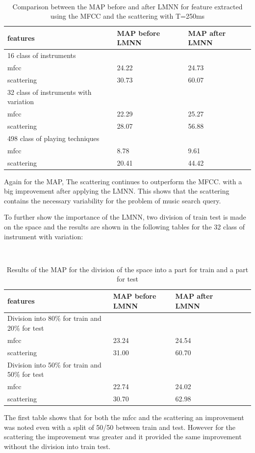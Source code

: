\documentclass[hidelinks,12pt]{report}
\begin{document}
  \begin{table} [H]
\begin{center} 
\ 
 \setlength{\tabcolsep}{.16667em} 
\begin{tabular}{|l|l|l|} 
\hline
features & MAP before LMNN & MAP after LMNN  \\ 
\hline 
16 class of instruments \\ 
\hline
mfcc         &     24.22& 24.73   \\ 
scattering   &30.73  & 60.07 \\ 

\hline 
32 class of instruments with variation \\ 
\hline
mfcc &22.29 & 25.27  \\ 
scattering &28.07& 56.88  \\ 
\hline 
498 class of playing techniques \\ 
\hline
mfcc &  8.78 & 9.61  \\ 
scattering &20.41& 44.42  \\ 
\hline
\end{tabular} 
\end{center} 
\caption{Comparison between the MAP before and after LMNN for feature extracted using the MFCC and the scattering with T=250ms} 
\label{you} 
\end{table}
Again for the MAP, The scattering continues to outperform the MFCC. with a big improvement after applying the LMNN. This shows that the scattering contains the necessary variability for the problem of music search query.\par
To further show the importance of the LMNN, two division of train test is made on the space and the results are shown in the following tables for the 32 class of instrument with variation:
\begin{table} [H]
\begin{center} 
\ 
 \setlength{\tabcolsep}{.16667em} 
\begin{tabular}{ | l | l | l | l | l |l|}
\hline
features & MAP before LMNN & MAP after LMNN  \\ 
\hline 
Division into 80\% for train and 20\% for test \\
\hline
mfcc & 23.24& 24.54  \\ 
scattering &31.00& 60.70    \\ 
\hline
Division into 50\% for train and 50\% for test \\
\hline
mfcc & 22.74& 24.02  \\ 
scattering & 30.70 & 62.98  \\ 
\hline
\end{tabular} 
\end{center} 
\caption{Results of the MAP for the division of the space into a part for train and a part for test} 
\label{you} 
\end{table} 
The first table shows that for both the mfcc and the scattering an improvement was noted even with a split of 50/50 between train and test. However for the scattering  the improvement was greater and it provided the same improvement without the division into train test.
\end{document}
